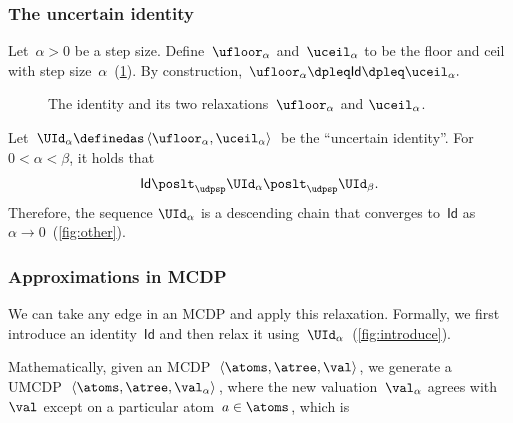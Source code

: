 \subsubsection{The uncertain identity}

Let~$\alpha>0$ be a step size. Define~$\ufloor_{\alpha}$ and~$\uceil_{\alpha}$
to be the floor and ceil with step size~$\alpha$~(\cref{fig:identity_approximation}).
By construction, $\ufloor_{\alpha}\dpleq\mathsf{Id}\dpleq\uceil_{\alpha}.$

\begin{figure}[h]
    \hfill{}\hfill{}

    \caption{\label{fig:identity_approximation}The identity and its two relaxations~$\ufloor_{\alpha}$
        and $\uceil_{\alpha}$.}
\end{figure}

Let $\UId_{\alpha}\definedas\left\langle \ufloor_{\alpha},\uceil_{\alpha}\right\rangle $
be the ``uncertain identity''. For~$0<\alpha<\beta$, it holds
that
\[
    \mathsf{Id}\poslt_{\udpsp}\UId_{\alpha}\poslt_{\udpsp}\UId_{\beta}.
\]
Therefore, the sequence $\UId_{\alpha}$ is a descending chain that
converges to~$\mathsf{Id}$ as~$\alpha\rightarrow0$~(\cref{fig:other}).


\subsubsection{Approximations in MCDP}

We can take any edge in an MCDP and apply this relaxation. Formally,
we first introduce an identity~$\mathsf{Id}$ and then relax it using~$\UId_{\alpha}$~(\cref{fig:introduce}).


Mathematically, given an MCDP~$\left\langle \atoms,\atree,\val\right\rangle $,
we generate a UMCDP~$\left\langle \atoms,\atree,\val_{\alpha}\right\rangle $,
where the new valuation~$\val_{\alpha}$ agrees with~$\val$ except
on a particular atom~$a\in\atoms$, which is